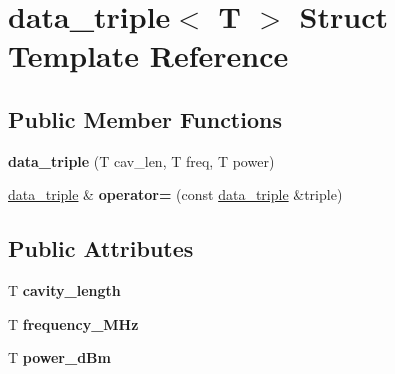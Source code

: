 \hypertarget{structdata__triple}{}\section{data\+\_\+triple$<$ T $>$ Struct Template Reference}
\label{structdata__triple}
\subsection*{Public Member Functions}
\begin{DoxyCompactItemize}
\item 
{\bfseries data\+\_\+triple} (T cav\+\_\+len, T freq, T power)\hypertarget{structdata__triple_a223be233f58eb5cb136fb0be322b4cb7}{}\label{structdata__triple_a223be233f58eb5cb136fb0be322b4cb7}

\item 
\hyperlink{structdata__triple}{data\+\_\+triple} \& {\bfseries operator=} (const \hyperlink{structdata__triple}{data\+\_\+triple} \&triple)\hypertarget{structdata__triple_a7da3f3ea534c4217ad69b110b087398c}{}\label{structdata__triple_a7da3f3ea534c4217ad69b110b087398c}

\end{DoxyCompactItemize}
\subsection*{Public Attributes}
\begin{DoxyCompactItemize}
\item 
T {\bfseries cavity\+\_\+length}\hypertarget{structdata__triple_a0c009762d01c841ed025b80a12955419}{}\label{structdata__triple_a0c009762d01c841ed025b80a12955419}

\item 
T {\bfseries frequency\+\_\+\+M\+Hz}\hypertarget{structdata__triple_a50bc0714de99feb9e3fcb1fa868d082b}{}\label{structdata__triple_a50bc0714de99feb9e3fcb1fa868d082b}

\item 
T {\bfseries power\+\_\+d\+Bm}\hypertarget{structdata__triple_a6f88f895f5d91c784ef723e87d904c14}{}\label{structdata__triple_a6f88f895f5d91c784ef723e87d904c14}

\end{DoxyCompactItemize}
